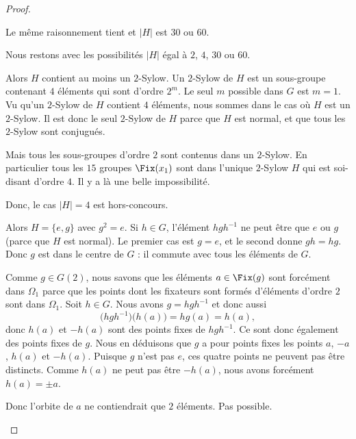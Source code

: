\begin{proof}
\begin{subproof}
		Le même raisonnement tient et \( | H |\) est \( 30\) ou \( 60\).
	\end{subproof}

	Nous restons avec les possibilités \( | H |\) égal à \( 2\), \( 4\), \( 30\) ou \( 60\).

	\begin{subproof}
		\spitem[Si \( | H | = 4\)]

		Alors \( H\) contient au moins un \( 2\)-Sylow. Un \( 2\)-Sylow de \( H\) est un sous-groupe contenant \( 4\) éléments qui sont d'ordre \( 2^m\). Le seul \( m\) possible dans \( G\) est \( m=1\). Vu qu'un \( 2\)-Sylow de \( H\) contient \( 4\) éléments, nous sommes dans le cas où \( H\) est un \( 2\)-Sylow. Il est donc le seul \( 2\)-Sylow de \( H\) parce que \( H\) est normal, et que tous les \( 2\)-Sylow sont conjugués.

		Mais tous les sous-groupes d'ordre \( 2\) sont contenus dans un \( 2\)-Sylow. En particulier tous les \( 15\) groupes \( \Fix(x_1)\) sont dans l'unique \( 2\)-Sylow \( H\) qui est soi-disant d'ordre \( 4\). Il y a là une belle impossibilité.

		Donc, le cas \( | H |=4\) est hors-concours.

		\spitem[Si \( | H |=2\)]
		Alors \( H=\{ e,g \}\) avec \( g^2=e\). Si \( h\in G\), l'élément \( hgh^{-1}\) ne peut être que \( e\) ou \( g\) (parce que \( H\) est normal). Le premier cas est \( g=e\), et le second donne \( gh=hg\). Donc \( g\) est dans le centre de \( G\) : il commute avec tous les éléments de \( G\).

		Comme \( g\in G(2)\), nous savons que les éléments \( a\in\Fix(g)\) sont forcément dans \( \Omega_1\) parce que les points dont les fixateurs sont formés d'éléments d'ordre \( 2\) sont dans \( \Omega_1\). Soit \( h\in G\). Nous avons \( g=hgh^{-1}\) et donc aussi
		\begin{equation}
			\big( hgh^{-1} \big)\big( h(a) \big)=hg(a)=h(a),
		\end{equation}
		donc \( h(a)\) et \( -h(a)\) sont des points fixes de \( hgh^{-1}\). Ce sont donc également des points fixes de \( g\). Nous en déduisons que \( g\) a pour points fixes les points \( a\), \( -a\), \( h(a)\) et \( -h(a)\). Puisque \( g\) n'est pas \( e\), ces quatre points ne peuvent pas être distincts. Comme \( h(a)\) ne peut pas être \( -h(a)\), nous avons forcément \( h(a)=\pm a\).

		Donc l'orbite de \( a\) ne contiendrait que \( 2\) éléments. Pas possible.


\end{subproof}
\end{proof}
